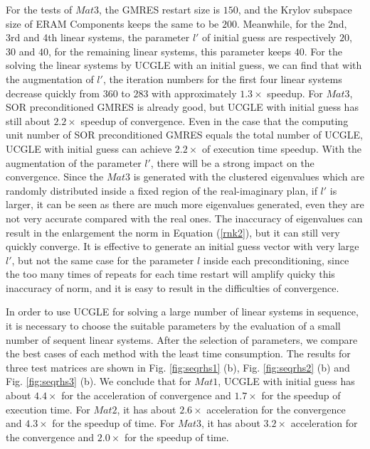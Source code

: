For the tests of $Mat3$, the GMRES restart size is $150$, and the Krylov subspace size of ERAM Components keeps the same to be $200$. Meanwhile, for the 2nd, 3rd and 4th linear systems, the parameter $l'$ of initial guess are respectively $20$, $30$ and $40$, for the remaining linear systems, this parameter keeps $40$. For the solving the linear systems by UCGLE with an initial guess, we can find that with the augmentation of $l'$, the iteration numbers for the first four linear systems decrease quickly from $360$ to $283$ with approximately $1.3 \times$ speedup. For $Mat3$, SOR preconditioned GMRES is already good, but UCGLE with initial guess has still about $2.2 \times$ speedup of convergence. Even in the case that the computing unit number of SOR preconditioned GMRES equals the total number of UCGLE, UCGLE with initial guess can achieve $2.2 \times$ of execution time speedup. With the augmentation of the parameter $l'$, there will be a strong impact on the convergence. Since the $Mat3$ is generated with the clustered eigenvalues which are randomly distributed inside a fixed region of the real-imaginary plan, if $l'$ is larger, it can be seen as there are much more eigenvalues generated, even they are not very accurate compared with the real ones. The inaccuracy of eigenvalues can result in the enlargement the norm in Equation (\ref{rnk2}), but it can still very quickly converge. It is effective to generate an initial guess vector with very large $l'$, but not the same case for the parameter $l$ inside each preconditioning, since the too many times of repeats for each time restart will amplify quicky this inaccuracy of norm, and it is easy to result in the difficulties of convergence.

In order to use UCGLE for solving a large number of linear systems in sequence, it is necessary to choose the suitable parameters by the evaluation of a small number of sequent linear systems. After the selection of parameters, we compare the best cases of each method with the least time consumption. The results for three test matrices are shown in Fig. \ref{fig:seqrhs1} (b), Fig. \ref{fig:seqrhs2} (b) and Fig. \ref{fig:seqrhs3} (b). We conclude that for $Mat1$, UCGLE with initial guess has about $4.4\times$ for the acceleration of convergence and $1.7\times$ for the speedup of execution time. For $Mat2$, it has about $2.6\times$ acceleration for the convergence and $4.3\times$ for the speedup of time. For $Mat3$, it has about $3.2\times$ acceleration for the convergence and $2.0\times$ for the speedup of time. 

